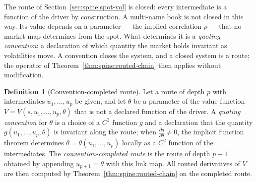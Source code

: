 \documentclass[11pt]{book}
\theoremstyle{plain}
\theoremstyle{definition}
\newtheorem{definition}[theorem]{Definition}
\theoremstyle{remark}
\newcommand{\pd}[2]{\frac{\partial #1}{\partial #2}}          %
\begin{document}
The route of Section~\ref{sec:spine:spot-vol} is closed: every intermediate is
a function of the driver by construction. A multi-name book is not closed in
this way. Its value depends on a parameter --- the implied correlation
$\rho$ --- that no market map determines from the spot. What determines it is
a \emph{quoting convention}: a declaration of which quantity the market holds
invariant as volatilities move. A convention closes the system, and a closed
system is a route; the operator of
Theorem~\ref{thm:spine:routed-chain} then applies without modification.

\begin{definition}[Convention-completed route]\label{def:spine:hook}
Let a route of depth $p$ with intermediates $u_1, \ldots, u_p$ be given, and
let $\theta$ be a parameter of the value function
$V = V(s, u_1, \ldots, u_p, \theta)$ that is not a declared function of the
driver. A \emph{quoting convention} for $\theta$ is a choice of a $C^2$
function $g$ and a declaration that the quantity $g(u_1, \ldots, u_p, \theta)$
is invariant along the route; when
$\pd{g}{\theta} \neq 0$, the implicit function theorem determines
$\theta = \theta(u_1, \ldots, u_p)$ locally as a $C^2$ function of the
intermediates. The \emph{convention-completed route} is the route of depth
$p + 1$ obtained by appending $u_{p+1} = \theta$ with this link map. All
routed derivatives of $V$ are then computed by
Theorem~\ref{thm:spine:routed-chain} on the completed route.
\end{definition}

\end{document}
